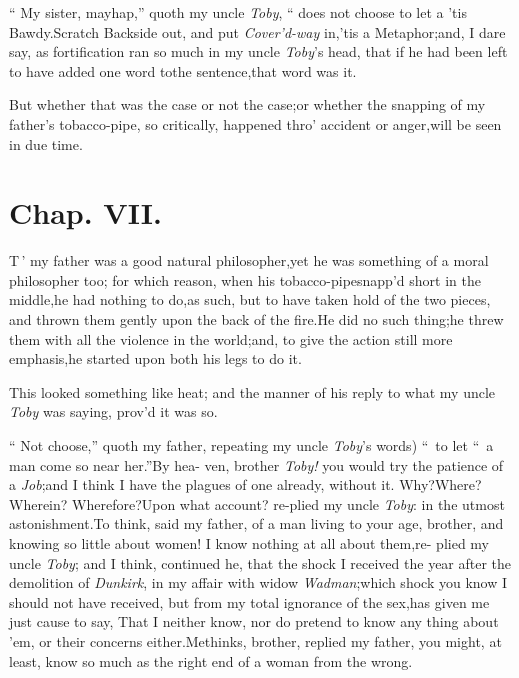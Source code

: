 \documentclass{article}
\begin{document}
\tsh “\kern 3pt My sister, mayhap,” quoth my uncle \textit{Toby},
“\kern 3pt does not choose to let a
’tis Bawdy.\tsk Scratch Backside out, and put
\textit{Cover’d-way} in,\tsk ’tis a Metaphor;\tsk\break and, I dare say, as
fortification ran so much in my uncle \textit{Toby}’s head, that if he had
been left to have added one word to\break the sentence,\tsh that word was
it.


But whether that was the case or not the case;\tsk or whether
the snapping of my father’s tobacco-pipe, so critically,
happened thro’ accident or anger,\tsk will be seen in due time.

\newpage
\section{Chap. VII.}

\lettrine{T}{\,}’ my father was a good natural
philosopher,\tsk yet he was something of a moral philosopher
too; for which reason, when his tobacco-pipe\break snapp’d short
in the middle,\tsk he had nothing to do,\tsk as such,\tsk
but to have taken hold of the two pieces, and thrown them
gently upon the back of the fire.\tsh\break He did no such
thing;\tsh he threw them with all the violence in the
world;\tsk and, to give the action still more
emphasis,\tsk\break he started upon both his legs to\break
do it.

This looked something like heat;\tsh\break
and the manner of his reply to what 
my uncle \textit{Toby} was saying, prov’d it\break
was so.

\newpage
\tsh “\kern 3pt Not choose,” quoth my father,
repeating my uncle \textit{Toby}’s words) “\, to let\break
“\, a man come so near her.”\tsh By hea-\break
ven, brother \textit{Toby!} you would try the patience of a
\textit{Job};\tsk and I think I have the plagues of one
already, without it.\break
\tsh Why?\tsh Where?\tsh Wherein?\tsh\break
Wherefore?\tsh Upon what account? re-\break plied my uncle \textit{Toby}: in the utmost
astonishment.\tsk To think, said my father, of a man living to
your age, brother, and knowing so little about
women!\tsh\break
I know nothing at all about them,\tsk re-\break
plied
my uncle \textit{Toby}; and I think, continued he, that the shock I
received the year after the demolition of \textit{Dunkirk}, in my
affair with widow \textit{Wadman};\tsk which shock you know I
should not have received, but from my total ignorance of the
sex,\tsk has given me just cause to say, That I neither
know, nor do pretend to\pb
know any thing about ’em, or their concerns either.\tsk Methinks, brother,
replied my father, you might, at least, know so much as the right
end of a woman from the wrong.
\end{document}
